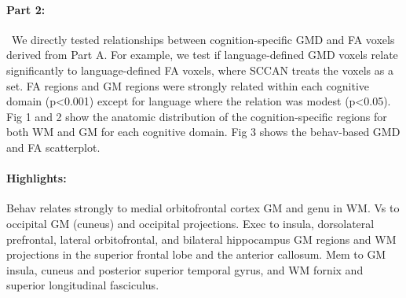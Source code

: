 \documentclass[paperwidth=48in,paperheight=48in,portrait,final]{tex/baposter}
\begin{document}
\begin{poster}
{\paragraph{Part 2:}~We directly tested relationships between
 cognition-specific GMD and FA voxels derived from Part A. For
 example, we test if language-defined GMD voxels relate significantly
 to language-defined FA voxels, where SCCAN treats the voxels as a
 set.
\newline
\newline
 FA regions and GM regions were strongly related within each cognitive
domain (p<0.001) except for language where the relation was modest
(p<0.05). Fig 1 and 2 show the anatomic distribution of the
cognition-specific regions for both WM and GM for each cognitive
domain. Fig 3 shows the behav-based GMD and FA scatterplot.
\newline
\paragraph{Highlights:} Behav relates strongly to medial orbitofrontal cortex GM and genu in WM. Vs to occipital GM (cuneus) and occipital projections. Exec to insula, dorsolateral prefrontal, lateral orbitofrontal, and bilateral hippocampus GM regions and WM projections in the superior frontal lobe and the anterior callosum. Mem to GM insula, cuneus and posterior superior temporal gyrus, and WM fornix and superior longitudinal fasciculus.
  \vspace{0.3em}
  }



\end{poster}
\end{document}
